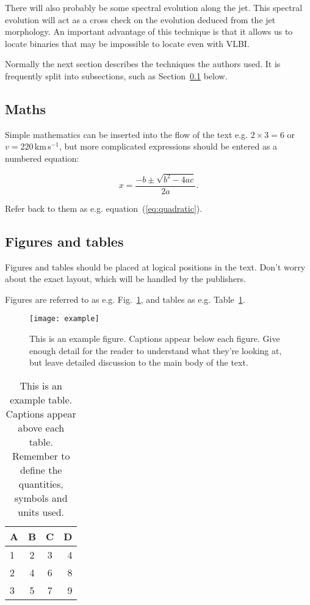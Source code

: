 There will also probably be some spectral evolution along the jet.
This spectral evolution will act as a cross check on the evolution
deduced from the jet morphology.  An important advantage of this
technique is that it allows us to locate binaries that may be
impossible to locate even with VLBI.


Normally the next section describes the techniques the authors used.
It is frequently split into subsections, such as Section~\ref{sec:maths} below.

\subsection{Maths}
\label{sec:maths} %

Simple mathematics can be inserted into the flow of the text e.g. $2\times3=6$
or $v=220$\,km\,s$^{-1}$, but more complicated expressions should be entered
as a numbered equation:

\begin{equation}
    x=\frac{-b\pm\sqrt{b^2-4ac}}{2a}.
	\label{eq:quadratic}
\end{equation}

Refer back to them as e.g. equation~(\ref{eq:quadratic}).

\subsection{Figures and tables}

Figures and tables should be placed at logical positions in the text. Don't
worry about the exact layout, which will be handled by the publishers.

Figures are referred to as e.g. Fig.~\ref{fig:example_figure}, and tables as
e.g. Table~\ref{tab:example_table}.

\begin{figure}
	\texttt{[image: example]}
    \caption{This is an example figure. Captions appear below each figure.
	Give enough detail for the reader to understand what they're looking at,
	but leave detailed discussion to the main body of the text.}
    \label{fig:example_figure}
\end{figure}

\begin{table}
	\centering
	\caption{This is an example table. Captions appear above each table.
	Remember to define the quantities, symbols and units used.}
	\label{tab:example_table}
	\begin{tabular}{lccr} %
		\hline
		A & B & C & D\\
		\hline
		1 & 2 & 3 & 4\\
		2 & 4 & 6 & 8\\
		3 & 5 & 7 & 9\\
		\hline
	\end{tabular}
\end{table}



